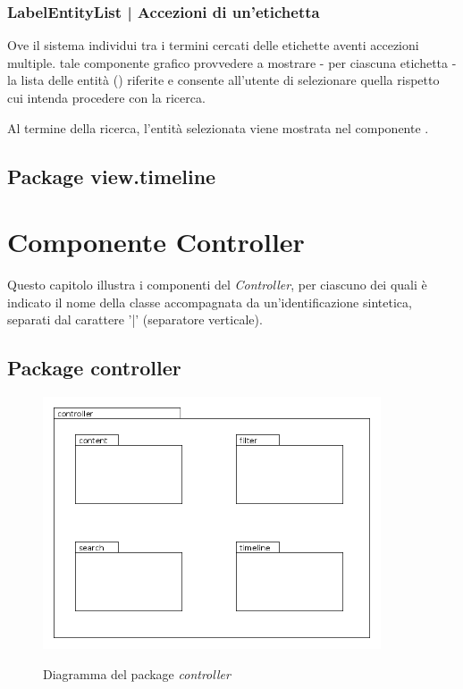 \documentclass[10pt,a4paper,headinclude,footinclude,hidelinks]{scrreprt} %
\begin{document}
	\subsection[LabelEntityList]{LabelEntityList | Accezioni di un'etichetta}
	\label{sec:stage:design:sistema:view.search:label-entity-list}
	Ove il sistema individui tra i termini cercati delle etichette aventi accezioni multiple. tale componente grafico provvedere a mostrare - per ciascuna etichetta - la lista delle entità (\textit{}) riferite e consente all'utente di selezionare quella rispetto cui intenda procedere con la ricerca.

	Al termine della ricerca, l'entità selezionata viene mostrata nel componente \textit{}.

	\section{Package view.timeline}
	\label{sec:stage:design:sistema:view.timeline}

	\chapter{Componente Controller}
	\label{ch:stage:design:controller}
	Questo capitolo illustra i componenti del \textit{Controller}, per ciascuno dei quali è indicato il nome della classe accompagnata da un'identificazione sintetica, separati dal carattere '|' (separatore verticale).

	\section{Package controller}
	\label{ch:stage:design:sistema:controller}

	\begin{figure}[ht]
		\begin{center}
	    	\includegraphics[width=10cm]{package/controller.png}
			\label{gfx:package:controller}
			\caption{Diagramma del package \textit{controller}}
		\end{center}
	\end{figure}
\end{document}
